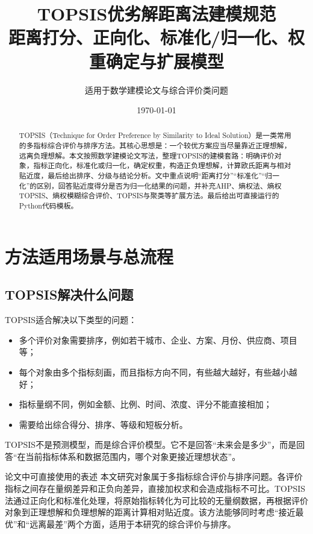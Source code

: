 \documentclass[UTF8,a4paper,12pt,fontset=none]{ctexart}
\title{\bfseries\sffamily\color{mainblue} TOPSIS优劣解距离法建模规范\\\large 距离打分、正向化、标准化/归一化、权重确定与扩展模型}
\author{适用于数学建模论文与综合评价类问题}
\date{\today}
\begin{document}
\maketitle
\begin{abstract}
TOPSIS（Technique for Order Preference by Similarity to Ideal Solution）是一类常用的多指标综合评价与排序方法。其核心思想是：一个较优方案应当尽量靠近正理想解，远离负理想解。本文按照数学建模论文写法，整理TOPSIS的建模套路：明确评价对象，指标正向化，标准化或归一化，确定权重，构造正负理想解，计算欧氏距离与相对贴近度，最后给出排序、分级与结论分析。文中重点说明“距离打分”“标准化”“归一化”的区别，回答贴近度得分是否为归一化结果的问题，并补充AHP、熵权法、熵权TOPSIS、熵权模糊综合评价、TOPSIS与聚类等扩展方法。最后给出可直接运行的Python代码模板。
\end{abstract}
\tableofcontents
\newpage

\section{方法适用场景与总流程}

\subsection{TOPSIS解决什么问题}
TOPSIS适合解决以下类型的问题：
\begin{itemize}[leftmargin=2em]
  \item 多个评价对象需要排序，例如若干城市、企业、方案、月份、供应商、项目等；
  \item 每个对象由多个指标刻画，而且指标方向不同，有些越大越好，有些越小越好；
  \item 指标量纲不同，例如金额、比例、时间、浓度、评分不能直接相加；
  \item 需要给出综合得分、排序、等级和短板分析。
\end{itemize}

TOPSIS不是预测模型，而是综合评价模型。它不是回答“未来会是多少”，而是回答“在当前指标体系和数据范围内，哪个对象更接近理想状态”。

\begin{paperbox}{论文中可直接使用的表述}
本文研究对象属于多指标综合评价与排序问题。各评价指标之间存在量纲差异和正负向差异，直接加权求和会造成指标不可比。TOPSIS法通过正向化和标准化处理，将原始指标转化为可比较的无量纲数据，再根据评价对象到正理想解和负理想解的距离计算相对贴近度。该方法能够同时考虑“接近最优”和“远离最差”两个方面，适用于本研究的综合评价与排序。
\end{paperbox}
\end{document}
